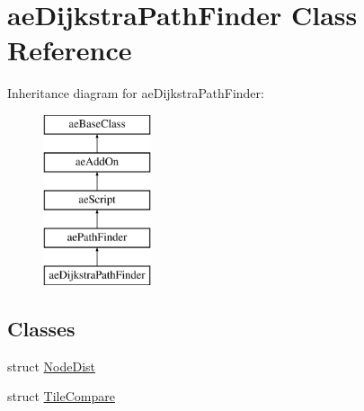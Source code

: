 \hypertarget{classae_dijkstra_path_finder}{}\section{ae\+Dijkstra\+Path\+Finder Class Reference}
\label{classae_dijkstra_path_finder}
Inheritance diagram for ae\+Dijkstra\+Path\+Finder\+:\begin{figure}[H]
\begin{center}
\leavevmode
\includegraphics[height=5.000000cm]{classae_dijkstra_path_finder}
\end{center}
\end{figure}
\subsection*{Classes}
\begin{DoxyCompactItemize}
\item 
struct \hyperlink{structae_dijkstra_path_finder_1_1_node_dist}{Node\+Dist}
\item 
struct \hyperlink{structae_dijkstra_path_finder_1_1_tile_compare}{Tile\+Compare}
\end{DoxyCompactItemize}
